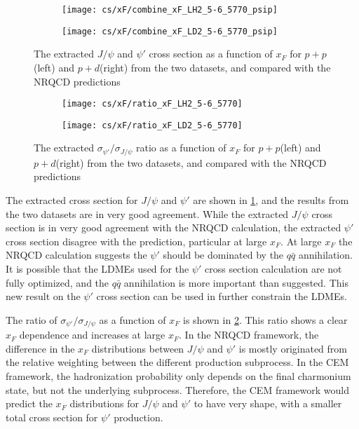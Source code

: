 \documentclass[../main.tex]{subfiles}
\begin{document}
\begin{figure}[h!]
	\centering
	\begin{subfigure}{0.45\linewidth}
		\texttt{[image: cs/xF/combine\_xF\_LH2\_5-6\_5770\_psip]}
	\end{subfigure}
	\centering
	\begin{subfigure}{0.45\linewidth}
		\texttt{[image: cs/xF/combine\_xF\_LD2\_5-6\_5770\_psip]}
	\end{subfigure}
	\caption{The extracted $J/\psi$ and $\psi'$ cross section as a function of $x_F$ for $p+p$(left)
		and $p+d$(right) from the two datasets,	and compared with the NRQCD predictions}
	\label{fig:cs_xF_combined}
\end{figure}
\begin{figure}[h!]
	\centering
	\begin{subfigure}{0.45\linewidth}
		\texttt{[image: cs/xF/ratio\_xF\_LH2\_5-6\_5770]}
	\end{subfigure}
	\begin{subfigure}{0.45\linewidth}
		\texttt{[image: cs/xF/ratio\_xF\_LD2\_5-6\_5770]}
	\end{subfigure}
	\caption{The extracted  $\sigma_{\psi'}/\sigma_{J/\psi}$ ratio as a function of $x_F$ for $p+p$(left)
		and $p+d$(right) from the two datasets,	and compared with the NRQCD predictions}
	\label{fig:cs_xF_ratio}
\end{figure}

The extracted cross section for $J/\psi$ and $\psi'$ are shown in \cref{fig:cs_xF_combined}, and
the results from the two datasets are in very good agreement. While the extracted
$J/\psi$ cross section is in very good agreement with the NRQCD calculation, the extracted $\psi'$
cross section disagree with the prediction, particular at large $x_F$. At large $x_F$ the NRQCD
calculation suggests the $\psi'$ should be dominated by the $q\bar{q}$ annihilation.
It is possible that the LDMEs used  for the $\psi'$ cross section calculation are not fully optimized,
and the $q\bar{q}$ annihilation is more important than suggested. This new result on the $\psi'$
cross section can be used in further constrain the LDMEs.

The ratio of $\sigma_{\psi'}/\sigma_{J/\psi}$ as a function of $x_F$ is shown in \cref{fig:cs_xF_ratio}.
This ratio shows a clear $x_F$ dependence and increases at large $x_F$. In the NRQCD framework,
the difference in the $x_F$ distributions between $J/\psi$ and $\psi'$ is mostly originated
from the relative weighting between the different production subprocess.
In the CEM framework, the hadronization probability only depends on
the final charmonium state, but not the underlying subprocess. Therefore, the CEM framework would predict
the $x_F$ distributions for $J/\psi$ and $\psi'$ to have very shape, with a smaller total cross section
for $\psi'$ production.
\end{document}

